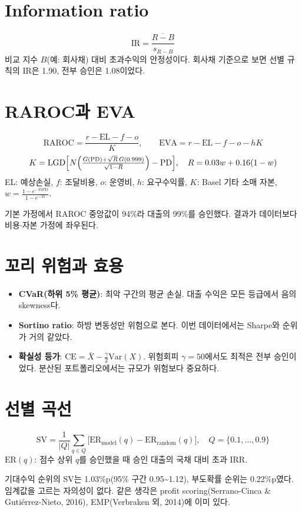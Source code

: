 \section{Information ratio}
\[ \mathrm{IR}=\frac{\overline{R-B}}{s_{R-B}} \]
비교 지수 $B$(예: 회사채) 대비 초과수익의 안정성이다. 회사채 기준으로 보면 선별 규칙의 IR은 1.90, 전부 승인은 1.08이었다.

\section{RAROC과 EVA}
\begin{formulabox}[은행 관점]
\[ \mathrm{RAROC}=\frac{r-\mathrm{EL}-f-o}{K},\qquad \mathrm{EVA}=r-\mathrm{EL}-f-o-hK \]
\[ K=\mathrm{LGD}\Bigl[N\Bigl(\tfrac{G(\mathrm{PD})+\sqrt{R}\,G(0.999)}{\sqrt{1-R}}\Bigr)-\mathrm{PD}\Bigr],\quad R=0.03w+0.16(1-w) \]
EL: 예상손실, $f$: 조달비용, $o$: 운영비, $h$: 요구수익률, $K$: Basel 기타 소매 자본, $w=\frac{1-e^{-35\mathrm{PD}}}{1-e^{-35}}$.
\end{formulabox}
\begin{warnbox}[주 지표로 쓰지 않은 이유]
기본 가정에서 RAROC 중앙값이 94\%라 대출의 99\%를 승인했다. 결과가 데이터보다 비용\ensuremath{\cdot}자본 가정에 좌우된다.
\end{warnbox}

\section{꼬리 위험과 효용}
\begin{itemize}
\item \textbf{CVaR(하위 5\% 평균)}: 최악 구간의 평균 손실. 대출 수익은 모든 등급에서 음의 skewness다.
\item \textbf{Sortino ratio}: 하방 변동성만 위험으로 본다. 이번 데이터에서는 Sharpe와 순위가 거의 같았다.
\item \textbf{확실성 등가}: $\mathrm{CE}=\bar X-\tfrac{\gamma}{2}\mathrm{Var}(X)$. 위험회피 $\gamma=50$에서도 최적은 전부 승인이었다. 분산된 포트폴리오에서는 규모가 위험보다 중요하다.
\end{itemize}

\section{선별 곡선}
\begin{formulabox}[선별 가치]
\[ \mathrm{SV}=\frac{1}{|Q|}\sum_{q\in Q}\bigl[\mathrm{ER}_{\text{model}}(q)-\mathrm{ER}_{\text{random}}(q)\bigr],\quad Q=\{0.1,\dots,0.9\} \]
$\mathrm{ER}(q)$: 점수 상위 $q$를 승인했을 때 승인 대출의 국채 대비 초과 IRR.
\end{formulabox}
기대수익 순위의 SV는 1.03\%p(95\% 구간 0.95\textasciitilde 1.12), 부도확률 순위는 0.22\%p였다. 임계값을 고르는 자의성이 없다. 같은 생각은 profit scoring(Serrano-Cinca \& Gutiérrez-Nieto, 2016), EMP(Verbraken 외, 2014)에 이미 있다.

